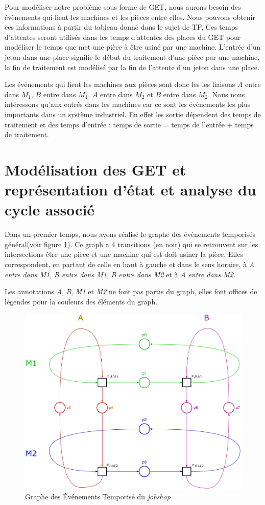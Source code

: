 Pour modéliser notre problème sous forme de GET, nous aurons besoin des évènements qui lient les machines et les pièces entre elles. Nous pouvons obtenir ces informations à partir du tableau donné dans le sujet de TP,  Ces temps d'attentes seront utilisés dans les temps d'attentes des places du GET pour modéliser le temps que met une pièce à être usiné par une machine. L'entrée d'un jeton dans une place signifie le début du traitement d'une pièce par une machine, la fin de traitement est modélisé par la fin de l'attente d'un jeton dans une place. 

Les événements qui lient les machines aux pièces sont donc les les liaisons $A$ entre dans $M_1$, $B$ entre dans $M_1$, $A$ entre dans $M_2$ et $B$ entre dans $M_2$. Nous nous intéressons qu'aux entrés dans les machines car ce sont les événements les plus importants dans un système industriel. En effet les sortie dépendent des temps de traitement et des temps d'entrée : temps de sortie = temps de l'entrée + temps de traitement.

\section{Modélisation des GET et représentation d'état et analyse du cycle associé}

Dans un premier temps, nous avons réalisé le graphe des événements temporisés général(voir figure \ref{fig:get}). Ce graph a 4 transitions (en noir) qui se retrouvent sur les intersections être une pièce et une machine qui est doit usiner la pièce. Elles correspondent, en partant de celle en haut à gauche et dans le sens horaire, à \emph{A entre dans M1}, \emph{B entre dans M1}, \emph{B entre dans M2} et à \emph{A entre dans M2}. 

Les annotations \emph{A}, \emph{B}, \emph{M1} et \emph{M2} ne font pas partis du graph, elles font offices de légendes pour la couleurs des éléments du graph.

\begin{figure}[!ht]
\centering
\includegraphics[width = .75\textwidth]{./II/images/GET.pdf}
\caption{\label{fig:get} Graphe des Événements Temporisé du \emph{jobshop}}
\end{figure}

